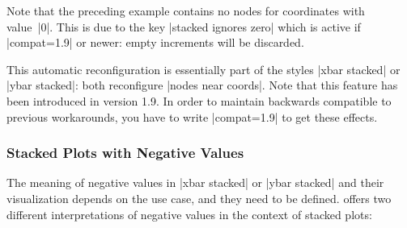 {Note that the preceding example contains no nodes for coordinates with
value~|0|. This is due to the key |stacked ignores zero| which is active if
|compat=1.9| or newer: empty increments will be discarded.

This automatic reconfiguration is essentially part of the styles |xbar stacked|
or |ybar stacked|: both reconfigure |nodes near coords|. Note that this
feature has been introduced in version 1.9. In order to maintain backwards
compatible to previous workarounds, you have to write |compat=1.9| to get these
effects.

\begin{codeexample}[]
\end{codeexample}


\subsubsection{Stacked Plots with Negative Values}

The meaning of negative values in |xbar stacked| or |ybar stacked| and their
visualization depends on the use case, and they need to be defined. \PGFPlots{}
offers two different interpretations of negative values in the context of
stacked plots:

}
